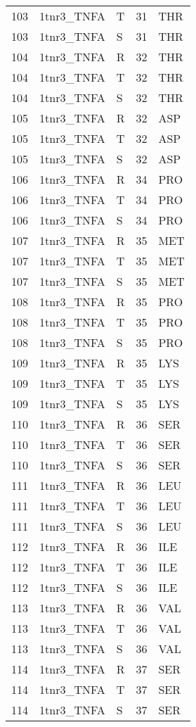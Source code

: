 \begin{longtable}[l]{l|l|l|l|l}
	103 & 1tnr3_TNFA & T & 31 & THR \\
	103 & 1tnr3_TNFA & S & 31 & THR \\
	104 & 1tnr3_TNFA & R & 32 & THR \\
	104 & 1tnr3_TNFA & T & 32 & THR \\
	104 & 1tnr3_TNFA & S & 32 & THR \\
	105 & 1tnr3_TNFA & R & 32 & ASP \\
	105 & 1tnr3_TNFA & T & 32 & ASP \\
	105 & 1tnr3_TNFA & S & 32 & ASP \\
	106 & 1tnr3_TNFA & R & 34 & PRO \\
	106 & 1tnr3_TNFA & T & 34 & PRO \\
	106 & 1tnr3_TNFA & S & 34 & PRO \\
	107 & 1tnr3_TNFA & R & 35 & MET \\
	107 & 1tnr3_TNFA & T & 35 & MET \\
	107 & 1tnr3_TNFA & S & 35 & MET \\
	108 & 1tnr3_TNFA & R & 35 & PRO \\
	108 & 1tnr3_TNFA & T & 35 & PRO \\
	108 & 1tnr3_TNFA & S & 35 & PRO \\
	109 & 1tnr3_TNFA & R & 35 & LYS \\
	109 & 1tnr3_TNFA & T & 35 & LYS \\
	109 & 1tnr3_TNFA & S & 35 & LYS \\
	110 & 1tnr3_TNFA & R & 36 & SER \\
	110 & 1tnr3_TNFA & T & 36 & SER \\
	110 & 1tnr3_TNFA & S & 36 & SER \\
	111 & 1tnr3_TNFA & R & 36 & LEU \\
	111 & 1tnr3_TNFA & T & 36 & LEU \\
	111 & 1tnr3_TNFA & S & 36 & LEU \\
	112 & 1tnr3_TNFA & R & 36 & ILE \\
	112 & 1tnr3_TNFA & T & 36 & ILE \\
	112 & 1tnr3_TNFA & S & 36 & ILE \\
	113 & 1tnr3_TNFA & R & 36 & VAL \\
	113 & 1tnr3_TNFA & T & 36 & VAL \\
	113 & 1tnr3_TNFA & S & 36 & VAL \\
	114 & 1tnr3_TNFA & R & 37 & SER \\
	114 & 1tnr3_TNFA & T & 37 & SER \\
	114 & 1tnr3_TNFA & S & 37 & SER \\

\end{longtable}
